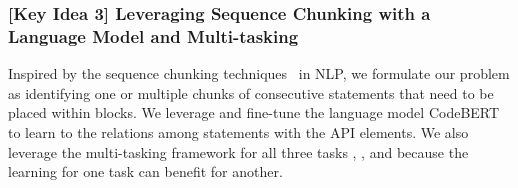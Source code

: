 

\subsubsection{{\bf [Key Idea 3] Leveraging Sequence Chunking with a Language Model and Multi-tasking}} 
Inspired by the sequence chunking
techniques~\cite{sequence-chunking-aaai17} in NLP, we formulate our
problem as identifying one or multiple chunks of consecutive
statements that need to be placed within  blocks. We
leverage and fine-tune the language model
CodeBERT~\cite{codebert-emnlp20} to learn to the relations among
statements with the API elements.  We also leverage the multi-tasking
framework for all three tasks {\xblock}, {\xstate}, and {\xtype}
because the learning for one task can benefit for another.

